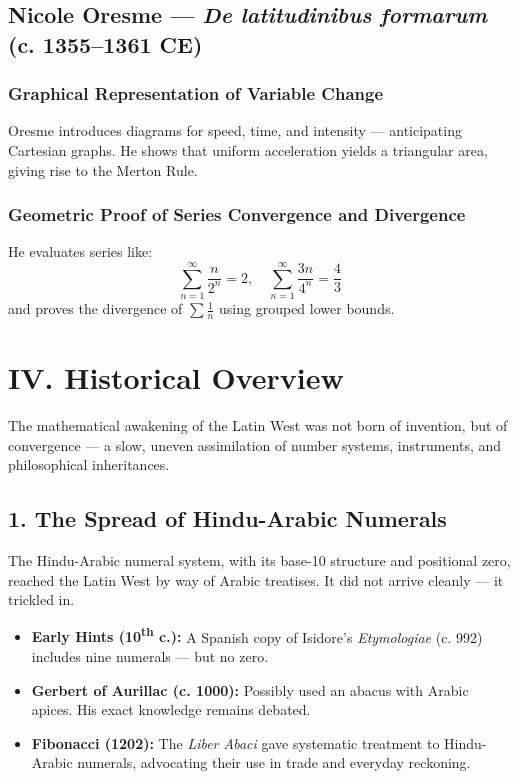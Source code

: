 \documentclass[9pt]{article}
\begin{document}
\subsection*{Nicole Oresme — \textit{De latitudinibus formarum} (c. 1355–1361 CE)}

\subsubsection*{Graphical Representation of Variable Change}

Oresme introduces diagrams for speed, time, and intensity — anticipating Cartesian graphs.  
He shows that uniform acceleration yields a triangular area, giving rise to the Merton Rule.

\subsubsection*{Geometric Proof of Series Convergence and Divergence}

He evaluates series like:
\[
\sum_{n=1}^\infty \frac{n}{2^n} = 2, \quad \sum_{n=1}^\infty \frac{3n}{4^n} = \frac{4}{3}
\]
and proves the divergence of \( \sum \frac{1}{n} \) using grouped lower bounds.



\newpage

\section*{IV. Historical Overview}

The mathematical awakening of the Latin West was not born of invention, but of convergence —  
a slow, uneven assimilation of number systems, instruments, and philosophical inheritances.

\subsection*{1. The Spread of Hindu-Arabic Numerals}

The Hindu-Arabic numeral system, with its base-10 structure and positional zero, reached the Latin West by way of Arabic treatises.  
It did not arrive cleanly — it trickled in.

\begin{itemize}
    \item \textbf{Early Hints (10\textsuperscript{th} c.):} A Spanish copy of Isidore’s \textit{Etymologiae} (c. 992) includes nine numerals — but no zero.
    \item \textbf{Gerbert of Aurillac (c. 1000):} Possibly used an abacus with Arabic apices. His exact knowledge remains debated.
    \item \textbf{Fibonacci (1202):} The \textit{Liber Abaci} gave systematic treatment to Hindu-Arabic numerals, advocating their use in trade and everyday reckoning.
\end{itemize}
\end{document}
